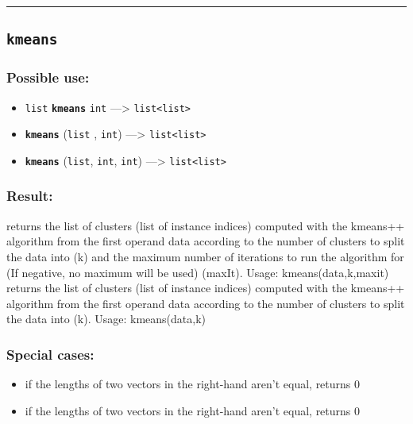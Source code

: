 \documentclass[]{book}
\providecommand{\tightlist}{%
  \setlength{\itemsep}{0pt}\setlength{\parskip}{0pt}}
\theoremstyle{definition}
\theoremstyle{definition}
\theoremstyle{definition}
\theoremstyle{remark}
\begin{document}
\begin{center}\rule{0.5\linewidth}{\linethickness}\end{center}

\subsection{\texorpdfstring{\texttt{kmeans}}{kmeans}}\label{kmeans}

\subsubsection{Possible use:}\label{possible-use-313}

\begin{itemize}
\tightlist
\item
  \texttt{list} \textbf{\texttt{kmeans}} \texttt{int} ---\textgreater{}
  \texttt{list\textless{}list\textgreater{}}
\item
  \textbf{\texttt{kmeans}} (\texttt{list} , \texttt{int})
  ---\textgreater{} \texttt{list\textless{}list\textgreater{}}
\item
  \textbf{\texttt{kmeans}} (\texttt{list}, \texttt{int}, \texttt{int})
  ---\textgreater{} \texttt{list\textless{}list\textgreater{}}
\end{itemize}

\subsubsection{Result:}\label{result-303}

returns the list of clusters (list of instance indices) computed with
the kmeans++ algorithm from the first operand data according to the
number of clusters to split the data into (k) and the maximum number of
iterations to run the algorithm for (If negative, no maximum will be
used) (maxIt). Usage: kmeans(data,k,maxit) returns the list of clusters
(list of instance indices) computed with the kmeans++ algorithm from the
first operand data according to the number of clusters to split the data
into (k). Usage: kmeans(data,k)

\subsubsection{Special cases:}\label{special-cases-82}

\begin{itemize}
\tightlist
\item
  if the lengths of two vectors in the right-hand aren't equal, returns
  0\\
\item
  if the lengths of two vectors in the right-hand aren't equal, returns
  0
\end{itemize}
\end{document}

